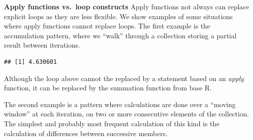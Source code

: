 \documentclass[krantz2]{krantz}\usepackage{knitr}%
\begin{document}
\begin{explainbox}
\textbf{Apply functions vs.\ loop constructs} Apply functions not always can replace explicit loops as they are less flexible. We show examples of some situations where apply functions cannot replace  loops. The first example is the accumulation pattern, where we ``walk'' through a collection storing a partial result between iterations.

\begin{knitrout}\footnotesize
{}\color{fgcolor}\begin{kframe}
\begin{alltt}
\hlstd{(}\hlstd{)}
 \hlkwb{<-} \hlstd{(}\hlstd{)}
\end{alltt}
\end{kframe}
\end{knitrout}

\begin{knitrout}\footnotesize
{}\color{fgcolor}\begin{kframe}
\begin{alltt}
 \hlkwb{<-} 
   \hlstd{(} 
     \hlkwb{<-}  \hlopt{+} 
  \hlstd{\}}
\end{alltt}
\begin{verbatim}
## [1] 4.630601
\end{verbatim}
\end{kframe}
\end{knitrout}

Although the loop above cannot the replaced by a statement based on an \emph{apply} function, it can be replaced by the summation function  from base R.

The second example is a pattern where calculations are done over a ``moving window'' at each iteration, on two or more consecutive elements of the collection. The simplest and probably most frequent calculation of this kind is the calculation of differences between successive members.


\end{explainbox}
\end{document}
